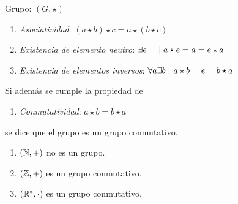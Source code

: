 \documentclass[10pt,t]{beamer}
\begin{document}
\begin{frame}%
    \begin{block}{\centering \large Grupo: $(G,\star)$}
        \begin{enumerate}[label=\roman*)]
            \item \textit{Asociatividad}: \hspace{9em}
                $(a \star b) \star c = a \star (b \star c)$
            \item \textit{Existencia de elemento neutro}: \hspace{1.7em}
                $\exists e \hspace{1.12em} \mid  a \star e = a = e \star a$
            \item \textit{Existencia de elementos inversos}: \hspace{0.6em}
                $\forall a \exists b \mid \hspace{0.1em} a \star b  = e = b \star a$
        \end{enumerate}
        Si además se cumple la propiedad de
        \begin{enumerate}[label=iv)]
            \item \textit{Conmutatividad}: \hspace{8.4em}
            $a \star b  = b \star a$
        \end{enumerate}
        se dice que el grupo es un \alert{grupo conmutativo}.
    \end{block} 

    \begin{plainexample}
        \begin{enumerate}[label=--]
            \item $(\mathbb{N},+)$ no es un grupo.
            \item $(\mathbb{Z},+)$ es un grupo conmutativo.
            \item $(\mathbb{R}^*,\cdot)$ es un grupo conmutativo.
        \end{enumerate}
    \end{plainexample}
\end{frame}
\end{document}
